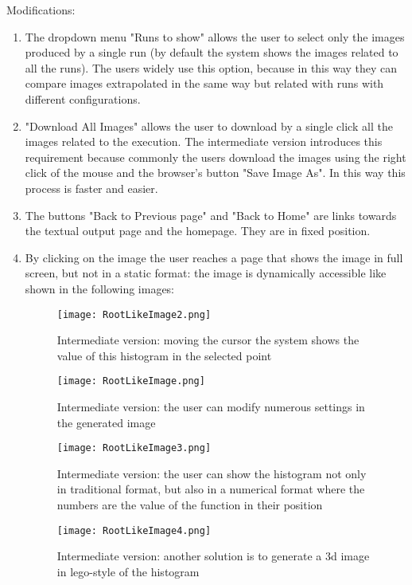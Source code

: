 Modifications:
\begin{enumerate}

\item The dropdown menu "Runs to show" allows the user to select only the images produced by a single run (by default the system shows the images related to all the runs). The users widely use this option, because in this way they can compare images extrapolated in the same way but related with runs with different configurations.

\item "Download All Images" allows the user to download by a single click all the images related to the execution. The intermediate version introduces this requirement because commonly the users download the images using the right click of the mouse and the browser's button "Save Image As". In this way this process is faster and easier.

\item The buttons "Back to Previous page" and "Back to Home" are links towards the textual output page and the homepage. They are in fixed position.

\item By clicking on the image the user reaches a page that shows the image in full screen, but not in a static format: the image is dynamically accessible like shown in the following images:

\begin{figure}[H]
\centering
\texttt{[image: RootLikeImage2.png]} 
\caption{Intermediate version: moving the cursor the system shows the value of this histogram in the selected point}
\end{figure}



\begin{figure}[H]
\centering
\texttt{[image: RootLikeImage.png]} 
\caption{Intermediate version: the user can modify numerous settings in the generated image}
\end{figure}

\begin{figure}[H]
\centering
\texttt{[image: RootLikeImage3.png]} 
\caption{Intermediate version: the user can show the histogram not only in traditional format, but also in a numerical format where the numbers are the value of the function in their position}
\end{figure}

\begin{figure}[H]
\centering
\texttt{[image: RootLikeImage4.png]} 
\caption{Intermediate version: another solution is to generate a 3d image in lego-style of the histogram}
\end{figure}


 
\end{enumerate}


